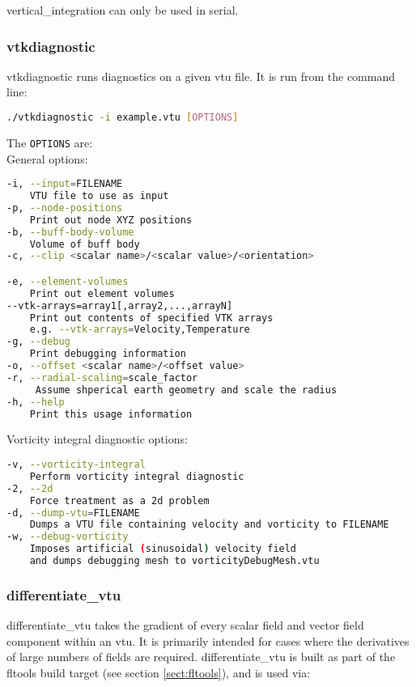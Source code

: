 vertical\_integration can only be used in serial.


\subsubsection{vtkdiagnostic}
\label{sect:vtkdiagnostic}
vtkdiagnostic runs diagnostics on a given vtu file. It is run from the command line:
\begin{lstlisting}[language = Bash]
./vtkdiagnostic -i example.vtu [OPTIONS]
\end{lstlisting}

The \lstinline[language = Bash]+OPTIONS+ are: \\
General options:
\begin{lstlisting}[language = Bash]
-i, --input=FILENAME
	VTU file to use as input
-p, --node-positions
	Print out node XYZ positions
-b, --buff-body-volume
	Volume of buff body
-c, --clip <scalar name>/<scalar value>/<orientation>

-e, --element-volumes
	Print out element volumes
--vtk-arrays=array1[,array2,...,arrayN]
	Print out contents of specified VTK arrays
	e.g. --vtk-arrays=Velocity,Temperature
-g, --debug
	Print debugging information
-o, --offset <scalar name>/<offset value>
-r, --radial-scaling=scale_factor
	 Assume shperical earth geometry and scale the radius
-h, --help
	Print this usage information
\end{lstlisting}
Vorticity integral diagnostic options:
\begin{lstlisting}[language = Bash]
-v, --vorticity-integral
	Perform vorticity integral diagnostic
-2, --2d
	Force treatment as a 2d problem
-d, --dump-vtu=FILENAME
	Dumps a VTU file containing velocity and vorticity to FILENAME
-w, --debug-vorticity
	Imposes artificial (sinusoidal) velocity field
	and dumps debugging mesh to vorticityDebugMesh.vtu
\end{lstlisting}


\subsubsection{differentiate\_vtu}
\label{sect:differentiate_vtu}

differentiate\_vtu takes the gradient of every scalar field and vector field
component within an vtu. It is primarily intended for cases where the derivatives
of large numbers of fields are required. differentiate\_vtu is built as part of the fltools
build target (see section \ref{sect:fltools}), and is used via:

